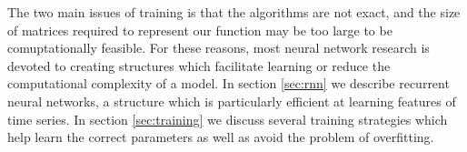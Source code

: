 The two main issues of training is that the algorithms are not exact, and the size of matrices required to represent our function may be too large to be comuptationally feasible. For these reasons, most neural network research is devoted to creating structures which facilitate learning or reduce the computational complexity of a model.  In section \ref{sec:rnn} we describe recurrent neural networks, a structure which is particularly efficient at learning features of time series.  In section \ref{sec:training} we discuss several training strategies which help learn the correct parameters as well as avoid the problem of overfitting.
